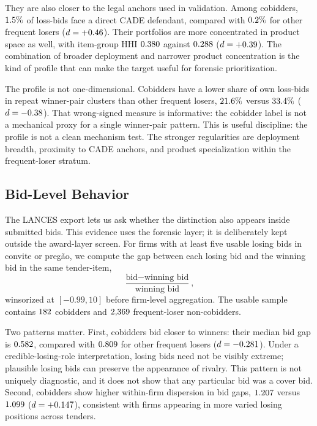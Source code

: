 They are also closer to the legal anchors used in validation.
Among cobidders, $1.5\%$ of loss-bids face a direct
CADE defendant, compared with $0.2\%$ for other
frequent losers ($d=+0.46$). Their portfolios are
more concentrated in product space as well, with item-group HHI
$0.380$ against $0.288$
($d=+0.39$). The combination of broader deployment and
narrower product concentration is the kind of profile that can
make the target useful for forensic prioritization.

The profile is not one-dimensional. Cobidders have a lower share
of own loss-bids in repeat winner-pair clusters than other
frequent losers, $21.6\%$ versus
$33.4\%$ ($d=-0.38$). That
wrong-signed measure is informative: the cobidder label is not a
mechanical proxy for a single winner-pair pattern. This is useful
discipline: the profile is not a clean mechanism test. The stronger
regularities are deployment breadth, proximity to CADE anchors,
and product specialization within the frequent-loser stratum.

\subsection{Bid-Level Behavior}
\label{sec:cobidder_bid}

The LANCES export lets us ask whether the distinction also
appears inside submitted bids. This evidence uses the forensic
layer; it is deliberately kept outside the award-layer screen.
For firms with at least five usable losing bids in convite or
preg\~ao, we compute the gap between each losing bid and the
winning bid in the same tender-item,
\[
  \frac{\text{bid}-\text{winning bid}}{\text{winning bid}},
\]
winsorized at $[-0.99,10]$ before firm-level aggregation. The
usable sample contains $182$ cobidders and
$2{,}369$ frequent-loser non-cobidders.

Two patterns matter. First, cobidders bid closer to winners:
their median bid gap is $0.582$, compared with
$0.809$ for other frequent losers
($d=-0.281$). Under a credible-losing-role
interpretation, losing bids need not be visibly extreme;
plausible losing bids can preserve the appearance of rivalry.
This pattern is not uniquely diagnostic, and it does not show
that any particular bid was a cover bid. Second, cobidders show
higher within-firm dispersion in bid gaps,
$1.207$ versus $1.099$
($d=+0.147$), consistent with firms appearing in more
varied losing positions across tenders.

